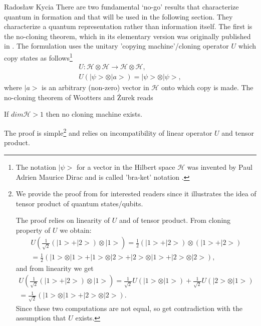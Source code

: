 \begin{artengenv}{Radosław Kycia}
There are two fundamental `no-go' results that characterize quantum in formation and that will be used in the following section. They characterize a quantum representation rather than information itself. The first is the no-cloning theorem, which in its elementary version was originally published in \parencite{NoCloning_WootersZurek}. The formulation uses the unitary 'copying machine'/cloning operator $U$ which copy states as follows\footnote{The notation $|\psi>$ for a vector in the Hilbert space $\mathcal{H}$ was invented by Paul Adrien Maurice Dirac and is called 'bra-ket' notation \parencite{QuantumComputing}.}
\begin{equation}
 \begin{array}{c}
  U: \mathcal{H} \otimes \mathcal{H} \rightarrow \mathcal{H}\otimes \mathcal{H}, \\
  U( | \psi> \otimes |a >) = | \psi> \otimes |\psi >,
 \end{array}
\end{equation}
where $|a>$ is an arbitrary (non-zero) vector in $\mathcal{H}$ onto which copy is made. The no-cloning theorem of Wootters and \.{Z}urek reads
\begin{Theorem}
\label{Th.NoClonning}
 If $dim\mathcal{H}>1$ then no cloning machine exists.
\end{Theorem}

The proof is simple\footnote{
We provide the proof from \parencite{NoCloning_WootersZurek} for interested readers since it illustrates the idea of tensor product of quantum states/qubits.

 The proof relies on linearity of $U$ and of tensor product. From cloning property of $U$ we obtain:
 \begin{equation}
 \begin{array}{c}
  U\left( \frac{1}{\sqrt{2}}(|1>+|2>)\otimes|1>\right)  =  \frac{1}{2}(|1>+|2>)\otimes(|1>+|2>) \\ 
  =\frac{1}{2}(|1>\otimes|1>+|1>\otimes|2>+|2>\otimes|1>+|2>\otimes|2>),
 \end{array}
 \end{equation}
and from linearity we get
\begin{equation}
\begin{array}{c}
 U\left( \frac{1}{\sqrt{2}}(|1>+|2>)\otimes|1>\right)  = \frac{1}{\sqrt{2}} U(|1>\otimes |1>) + \frac{1}{\sqrt{2}} U(|2>\otimes |1>)  \\ 
  =\frac{1}{\sqrt{2}}(|1>\otimes|1>+|2>\otimes|2>).
\end{array}
\end{equation}
Since these two computations are not equal, so get contradiction with the assumption that $U$ exists.
} and relies on incompatibility of linear operator $U$ and tensor product.



\end{artengenv}
